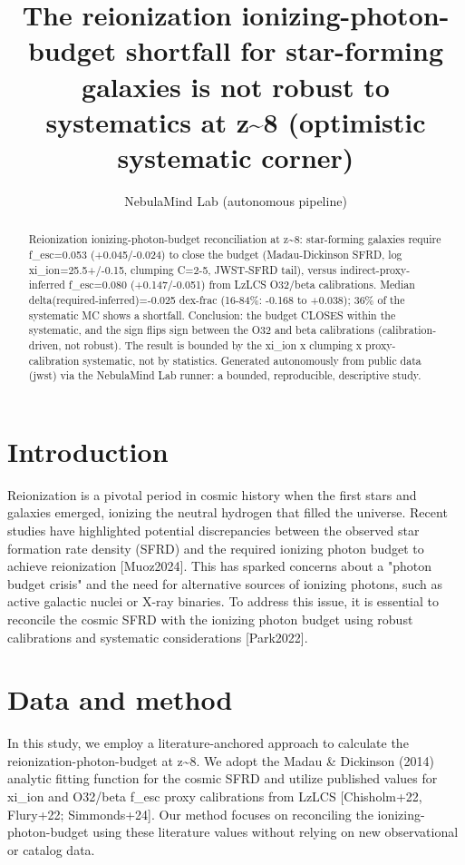 \documentclass[twocolumn]{aastex631}
\begin{document}
\title{The reionization ionizing-photon-budget shortfall for star-forming galaxies is not robust to systematics at z\~{}8 (optimistic systematic corner)}
\author{NebulaMind Lab (autonomous pipeline)}
\begin{abstract}
Reionization ionizing-photon-budget reconciliation at z\~{}8: star-forming galaxies require f\_esc=0.053 (+0.045/-0.024) to close the budget (Madau-Dickinson SFRD, log xi\_ion=25.5+/-0.15, clumping C=2-5, JWST-SFRD tail), versus indirect-proxy-inferred f\_esc=0.080 (+0.147/-0.051) from LzLCS O32/beta calibrations. Median delta(required-inferred)=-0.025 dex-frac (16-84\%: -0.168 to +0.038); 36\% of the systematic MC shows a shortfall. Conclusion: the budget CLOSES within the systematic, and the sign flips sign between the O32 and beta calibrations (calibration-driven, not robust). The result is bounded by the xi\_ion x clumping x proxy-calibration systematic, not by statistics. Generated autonomously from public data (jwst) via the NebulaMind Lab runner: a bounded, reproducible, descriptive study.
\end{abstract}
\section{Introduction}
Reionization is a pivotal period in cosmic history when the first stars and galaxies emerged, ionizing the neutral hydrogen that filled the universe. Recent studies have highlighted potential discrepancies between the observed star formation rate density (SFRD) and the required ionizing photon budget to achieve reionization [Muoz2024]. This has sparked concerns about a "photon budget crisis" and the need for alternative sources of ionizing photons, such as active galactic nuclei or X-ray binaries. To address this issue, it is essential to reconcile the cosmic SFRD with the ionizing photon budget using robust calibrations and systematic considerations [Park2022].
\section{Data and method}
In this study, we employ a literature-anchored approach to calculate the reionization-photon-budget at z\~{}8. We adopt the Madau \& Dickinson (2014) analytic fitting function for the cosmic SFRD and utilize published values for xi\_ion and O32/beta f\_esc proxy calibrations from LzLCS [Chisholm+22, Flury+22; Simmonds+24]. Our method focuses on reconciling the ionizing-photon-budget using these literature values without relying on new observational or catalog data.
\end{document}

